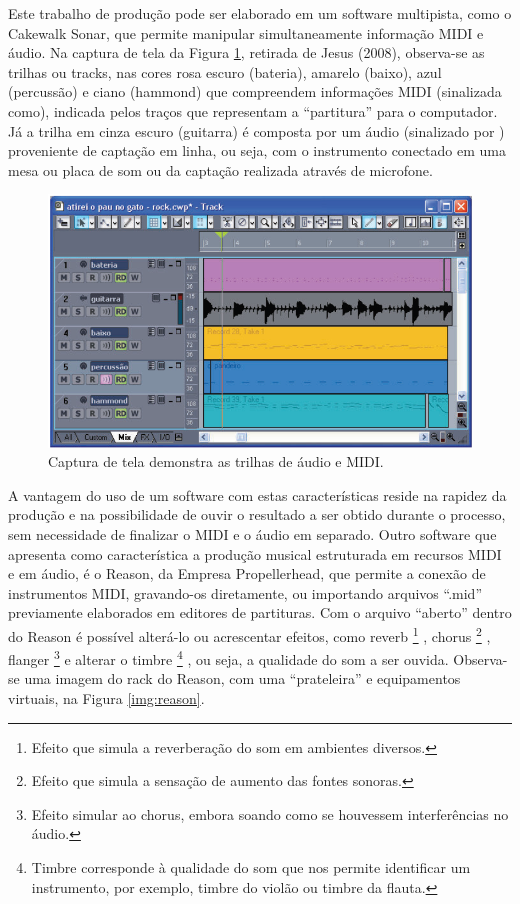 Este trabalho de produção pode ser elaborado em um software multipista, como o Cakewalk Sonar, que permite manipular simultaneamente informação MIDI e áudio. Na captura de tela da Figura \ref{img:midi}, retirada de Jesus (2008), observa-se as trilhas ou tracks, nas cores rosa escuro (bateria), amarelo (baixo), azul (percussão) e ciano (hammond) que compreendem informações MIDI (sinalizada como), indicada pelos traços que representam a ``partitura'' para o computador. Já a trilha em cinza escuro (guitarra) é composta por um áudio (sinalizado por ) proveniente de captação em linha, ou seja, com o instrumento conectado em uma mesa ou placa de som ou da captação realizada através de microfone. 

\begin{figure}[!ht]
 \centering
 \includegraphics[scale=0.8]{musica_midi.png}
 \caption{Captura de tela demonstra as trilhas de áudio e MIDI. \cite{bib:musica_jesus}}
 \label{img:midi}
\end{figure}

A vantagem do uso de um software com estas características reside na rapidez da produção e na possibilidade de ouvir o resultado a ser obtido durante o processo, sem necessidade de finalizar o MIDI e o áudio em separado.
Outro software que apresenta como característica a produção musical estruturada em recursos MIDI e em áudio, é o Reason, da Empresa Propellerhead, que permite a conexão de instrumentos MIDI, gravando-os diretamente, ou importando arquivos ``.mid'' previamente elaborados em editores de partituras. Com o arquivo ``aberto'' dentro do Reason é possível alterá-lo ou acrescentar efeitos, como reverb
\footnote{Efeito que simula a reverberação do som em ambientes diversos.}
, chorus
\footnote{Efeito que simula a sensação de aumento das fontes sonoras.}
, flanger
\footnote{Efeito simular ao chorus, embora soando como se houvessem interferências no áudio.} 
e alterar o timbre
\footnote{Timbre corresponde à qualidade do som que nos permite identificar um instrumento, por exemplo, timbre do violão ou timbre da flauta.}
, ou seja, a qualidade do som a ser ouvida. Observa-se uma imagem do rack do Reason, com  uma ``prateleira'' e equipamentos virtuais, na Figura \ref{img:reason}.

